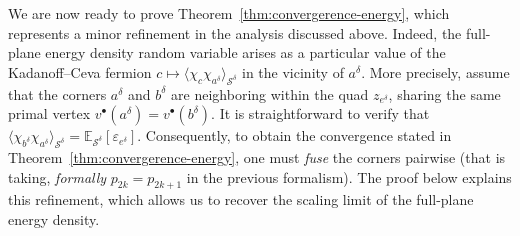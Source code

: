 \documentclass[reqno]{amsart}
\numberwithin{equation}{section}
\theoremstyle{definition}
\theoremstyle{remark}
\newcommand\cS{\mathcal{S}}
\begin{document}
We are now ready to prove Theorem~\ref{thm:convergerence-energy}, which represents a minor refinement in the analysis discussed above. Indeed, the full-plane energy density random variable arises as a particular value of the Kadanoff--Ceva fermion $c\mapsto \langle \chi_{c} \chi_{a^\delta} \rangle_{\cS^\delta}$ in the vicinity of $a^\delta$. More precisely, assume that the corners $a^\delta$ and $b^\delta$ are neighboring within the quad $z_{e^\delta}$, sharing the same primal vertex $v^\bullet(a^\delta)=v^\bullet(b^\delta)$. It is straightforward to verify that $\langle \chi_{b^\delta} \chi_{a^\delta} \rangle_{\cS^\delta} = \mathbb{E}_{\cS^\delta}[\varepsilon_{e^\delta}]$. Consequently, to obtain the convergence stated in Theorem~\ref{thm:convergerence-energy}, one must \emph{fuse} the corners pairwise (that is taking, \emph{formally} $p_{2k}=p_{2k+1}$ in the previous formalism). The proof below explains this refinement, which allows us to recover the scaling limit of the full-plane energy density.
\end{document}
